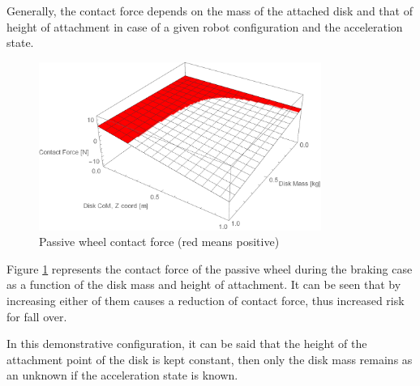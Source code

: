 \documentclass[12pt,english,twoside]{article}
\begin{document}
Generally, the contact force depends on the mass of the attached disk and that of height of attachment in case of a given robot configuration and the acceleration state. 
\begin{figure}[htb!]
	\centering
	\includegraphics[height=5.5cm]{figures/contactForce2D_2}
	\caption{Passive wheel contact force (red means positive)}
	\label{contactForce2D}
\end{figure}
Figure \ref{contactForce2D} represents the contact force of the passive wheel during the braking case as a function of the disk mass and height of attachment. It can be seen that by increasing either of them causes a reduction of contact force, thus increased risk for fall over.


In this demonstrative configuration, it can be said that the height of the attachment point of the disk is kept constant, then only the disk mass remains as an unknown if the acceleration state is known.
\end{document}
